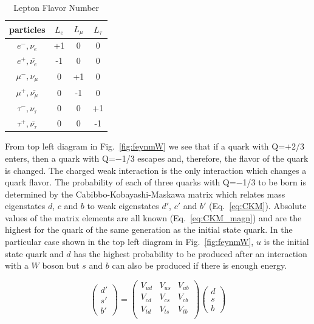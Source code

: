 \begin{table}[h]
  \begin{center}
  \caption{ Lepton Flavor Number}
  \vspace{5 mm}
  \begin{tabular}{|c|c|c|c|}
     \hline
     particles & $L_e$ & $L_{\mu}$ & $L_{\tau}$ \\ \hline
     $e^-,\nu_e$ &  +1  &  0  &  0  \\ \hline 
     $e^+, \bar{\nu_e}$ &  -1  &  0  &  0  \\ \hline 
     $\mu^-,\nu_{\mu}$ &  0  &  +1  &  0  \\ \hline 
     $\mu^+, \bar{\nu_{\mu}}$ &  0  &  -1  &  0  \\ \hline 
     $\tau^-,\nu_{\tau}$ &  0  &  0  &  +1  \\ \hline 
     $\tau^+, \bar{\nu_{\tau}}$ &  0  &  0  &  -1  \\ \hline 
  \end{tabular}
  \label{tab:LeptonFlavorNumber}
  \end{center}
\end{table}

From top left diagram in Fig.~\ref{fig:feynmW} we see that if a quark with Q=$+$2/3 enters, then a quark with Q=$-$1/3 escapes and, therefore, the flavor of the quark is changed. The charged weak interaction is the only interaction which changes a quark flavor. The probability of each of three quarks with Q=$-$1/3 to be born is determined by the Cabibbo-Kobayashi-Maskawa matrix which relates mass eigenstates $d$, $c$ and $b$ to weak eigenstates $d'$, $c'$ and $b'$ (Eq.~\ref{eq:CKM}). Absolute values of the matrix elements are all known (Eq.~\ref{eq:CKM_magn}) and are the highest for the quark of the same generation as the initial state quark. In the particular case shown in the top left diagram in Fig.~\ref{fig:feynmW}, $u$ is the initial state quark and $d$ has the highest probability to be produced after an interaction with a $W$ boson but $s$ and $b$ can also be produced if there is enough energy.

\begin{equation}\label{eq:CKM}
  \begin{pmatrix} d' \\ s' \\ b' \end{pmatrix}
     =
  \begin{pmatrix} 
     V_{ud} & V_{us} & V_{ub} \\
     V_{cd} & V_{cs} & V_{cb} \\
     V_{td} & V_{ts} & V_{tb} \\ 
  \end{pmatrix}
  \begin{pmatrix} d \\ s \\ b \end{pmatrix}
\end{equation}


